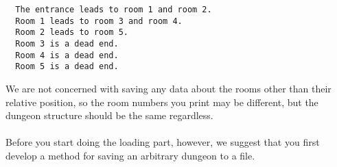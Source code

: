 \documentclass[12pt]{article}
\begin{document}
\begin{verbatim}
  The entrance leads to room 1 and room 2.
  Room 1 leads to room 3 and room 4.
  Room 2 leads to room 5.
  Room 3 is a dead end.
  Room 4 is a dead end.
  Room 5 is a dead end.
\end{verbatim}

We are not concerned with saving any data about the rooms other than their relative position, so the room numbers you print may be different, but the dungeon structure should be the same regardless.\\\\

Before you start doing the loading part, however, we suggest that you first develop a method for saving an arbitrary dungeon to a file. 
\end{document}
